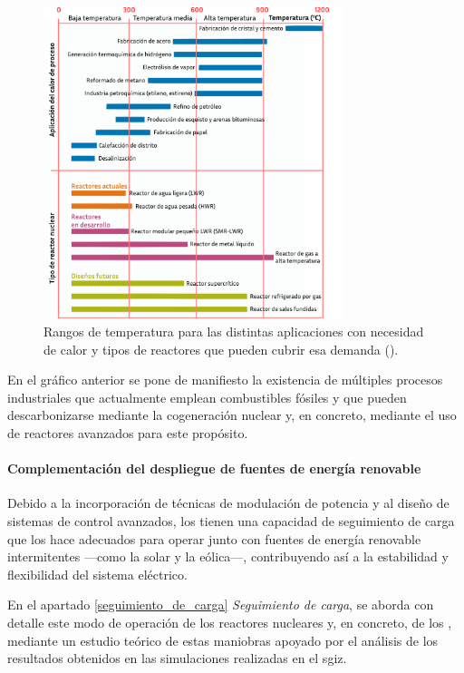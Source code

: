 \begin{figure}[h]
  \centering
  \includegraphics[width=0.78\textwidth]{content/figures/aplicaciones_calor.pdf}
  \caption{Rangos de temperatura para las distintas aplicaciones con necesidad de calor y tipos de reactores que pueden cubrir esa demanda (\cite{wna_heat_applications}).}
  \label{fig:wna_heat_applications}
\end{figure}

En el gráfico anterior se pone de manifiesto la existencia de múltiples procesos industriales que actualmente emplean combustibles fósiles y que pueden descarbonizarse mediante la cogeneración nuclear y, en concreto, mediante el uso de reactores avanzados para este propósito.

\paragraph{Complementación del despliegue de fuentes de energía renovable}

Debido a la incorporación de técnicas de modulación de potencia y al diseño de sistemas de control avanzados, los  tienen una capacidad de seguimiento de carga que los hace adecuados para operar junto con fuentes de energía renovable intermitentes ---como la solar y la eólica---, contribuyendo así a la estabilidad y flexibilidad del sistema eléctrico.

En el apartado \ref{seguimiento_de_carga} \textit{Seguimiento de carga}, se aborda con detalle este modo de operación de los reactores nucleares y, en concreto, de los , mediante un estudio teórico de estas maniobras apoyado por el análisis de los resultados obtenidos en las simulaciones realizadas en el \acrshort{sgiz}.

